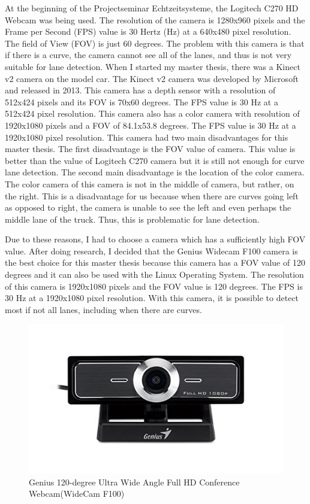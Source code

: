 At the beginning of the Projectseminar Echtzeitsysteme, the Logitech C270 HD Webcam was being used. The resolution of 
the camera is 1280x960 pixels and the Frame per Second (FPS) value is 30 Hertz (Hz) at a 640x480 pixel resolution. 
The field of View (FOV) is just 60 degrees. The problem with this camera is that if there is a curve, the camera 
cannot see all of the lanes, and thus is not very suitable for lane detection. When I started my master thesis, there 
was a Kinect v2 camera on the model car.  The Kinect v2 camera was developed by Microsoft and released in 2013. This 
camera has a depth sensor with a resolution of 512x424 pixels and its FOV is 70x60 degrees. The FPS value is 30 Hz at 
a 512x424 pixel resolution. This camera also has a color camera with resolution of 1920x1080 pixels and a FOV of 
84.1x53.8 degrees. The FPS value is 30 Hz at a 1920x1080 pixel resolution. This camera had two main disadvantages for 
this master thesis. The first disadvantage is the FOV value of camera. This value is better than the value of Logitech 
C270 camera but it is still not enough for curve lane detection. The second main disadvantage is the location of the 
color camera. The color camera of this camera is not in the middle of camera, but rather, on the right. This is a 
disadvantage for us because when there are curves going left as opposed to right, the camera is unable to see the 
left and even perhaps the middle lane of the truck. Thus, this is problematic for lane detection.

Due to these reasons, I had to choose a camera which has a sufficiently high FOV value. After doing research, I decided 
that the Genius Widecam F100 camera is the best choice for this master thesis because this camera has a FOV value of 
120 degrees and it can also be used with the Linux Operating System. The resolution of this camera is 1920x1080 pixels 
and the FOV value is 120 degrees. The FPS is 30 Hz at a 1920x1080 pixel resolution. With this camera, it is possible 
to detect most if not all lanes, including when there are curves. 

\begin{figure}[H]
	\centering
	\hspace*{0cm}   
	\includegraphics[width=150mm,scale=1]{./Bilder/Genius_F100_camera.png}
	\caption{Genius 120-degree Ultra Wide Angle Full HD Conference Webcam(WideCam F100) }
\end{figure}


